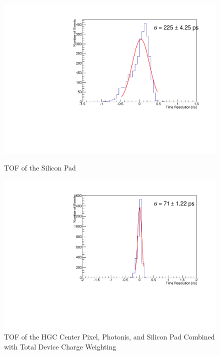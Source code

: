 \documentclass[12pt]{article}
\begin{document}
\begin{figure}
\centering
\begin{minipage}[t]{.49\textwidth}
	\centering
	\includegraphics[width=\textwidth]{deltaTSiPad.pdf}
	\caption{TOF of the Silicon Pad}
	\label{fig:SiPad}
\end{minipage} \hfill
\begin{minipage}[t]{.49\textwidth}
	\centering
	\includegraphics[width=\textwidth]{deltaTWeightsCorrected_totalcharge.pdf}
	\caption{TOF of the HGC Center Pixel, Photonis, and Silicon Pad Combined with Total Device Charge Weighting}
	\label{fig:wctc}
\end{minipage}
\end{figure}
\end{document}
